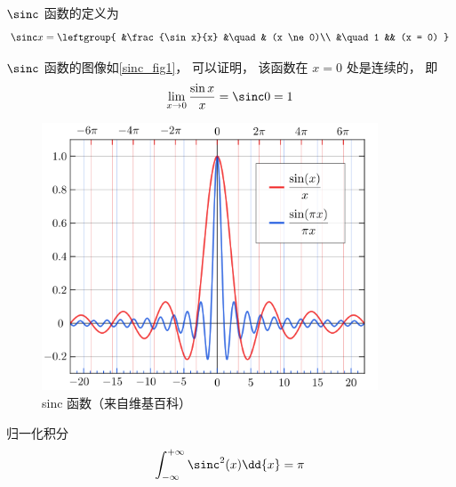 

$\sinc$ 函数的定义为
\begin{equation}
\sinc x = 
\leftgroup{
&\frac{\sin x}{x} &\quad & (x \ne 0)\\
&\quad 1 && (x = 0)
}\end{equation}

$\sinc$ 函数的图像如\autoref{sinc_fig1}， 可以证明， 该函数在 $x=0$ 处是连续的， 即
\begin{equation}
\lim_{x \to 0}\frac{\sin x}{x} = \sinc 0 = 1
\end{equation}

\begin{figure}[ht]
\centering
\includegraphics[width=10cm]{./figures/sinc1.png}
\caption{sinc 函数（来自维基百科）} \label{sinc_fig1}
\end{figure}

归一化积分
\begin{equation}
\int_{-\infty}^{+\infty} \sinc^2(x) \dd{x} = \pi
\end{equation}
